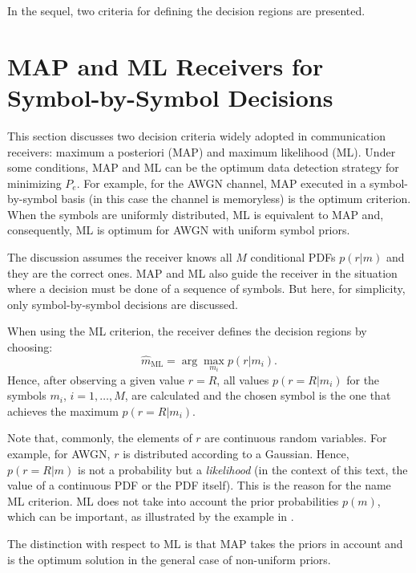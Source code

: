 In the sequel, two criteria for defining the decision regions are presented.

\section{MAP and ML Receivers for Symbol-by-Symbol Decisions}
\label{sec:MAPandML}

This section discusses two decision criteria widely adopted in communication receivers: maximum a posteriori (MAP) and maximum likelihood (ML).
Under some conditions, MAP and ML can be the optimum data detection strategy for minimizing $P_e$. For example, for the 
AWGN channel, MAP executed in a symbol-by-symbol basis (in this case the channel is memoryless) is the optimum criterion. When the symbols are uniformly distributed, ML is equivalent to MAP and, consequently, ML is optimum for AWGN with uniform symbol priors.

The discussion assumes the receiver knows all $M$ conditional PDFs $p(r|m)$ and they are the correct ones. 
MAP and ML also guide the receiver in the situation where a decision must be done of a sequence of symbols. But here, for simplicity, only symbol-by-symbol decisions are discussed.

When using the ML criterion, the receiver defines the decision regions by choosing:
\[
\hat m_\textrm{ML} = \arg \max_{m_i} p(r|m_i).
\]
Hence, after observing a given value $r=R$, all values $p(r=R|m_i)$ for the symbols $m_i$, $i=1,\ldots,M$, are calculated and the chosen symbol is the one that achieves the maximum $p(r=R|m_i)$. 

Note that, commonly, the elements of $r$ are continuous random variables. For example, for AWGN, $r$ is distributed according to a Gaussian. Hence, $p(r=R|m)$ is not a probability but a \emph{likelihood} (in the context of this text, the value of a continuous PDF or the PDF itself). This is the reason for the name ML criterion. ML does not take into account the prior probabilities $p(m)$, which can be important, as illustrated by the example in .

The distinction with respect to ML is that MAP takes the priors in account and is the optimum solution in the general case of non-uniform priors.

